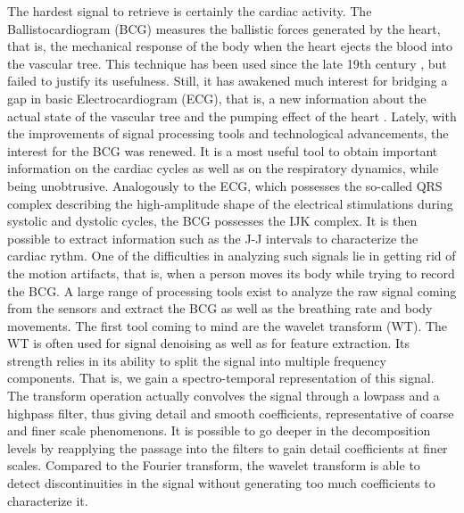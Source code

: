 \documentclass[twoside,onecolumn]{article}
\begin{document}
The hardest signal to retrieve is certainly the cardiac activity. The Ballistocardiogram (BCG) measures the ballistic forces generated by the heart, that is, the mechanical response of the body when the heart ejects the blood into the vascular tree. This technique has been used since the late 19th century \cite{gordon_certain_1877}, but failed to justify its usefulness. Still, it has awakened much interest for bridging a gap in basic Electrocardiogram (ECG), that is, a new information about the actual state of the vascular tree and the pumping effect of the heart \cite{singewald_ballistocardiography:_1954}. Lately, with the improvements of signal processing tools and technological advancements, the interest for the BCG was renewed. It is a most useful tool to obtain important information on the cardiac cycles as well as on the respiratory dynamics, while being unobtrusive. Analogously to the ECG, which possesses the so-called QRS complex describing the high-amplitude shape of the electrical stimulations during systolic and dystolic cycles, the BCG possesses the IJK complex. It is then possible to extract information such as the J-J intervals to characterize the cardiac rythm. One of the difficulties in analyzing such signals lie in getting rid of the motion artifacts, that is, when a person moves its body while trying to record the BCG.
A large range of processing tools exist to analyze the raw signal coming from the sensors and extract the BCG as well as the breathing rate and body movements. The first tool coming to mind are the wavelet transform (WT).
The WT is often used for signal denoising as well as for feature extraction. Its strength relies in its ability to split the signal into multiple frequency components. That is, we gain a spectro-temporal representation of this signal. The transform operation actually convolves the signal through  a lowpass and a highpass filter, thus giving detail and smooth coefficients, representative of coarse and finer scale phenomenons. It is possible to go deeper in the decomposition levels by reapplying the passage into the filters to gain detail coefficients at finer scales. Compared to the Fourier transform, the wavelet transform is able to detect discontinuities in the signal without generating too much coefficients to characterize it. 
\end{document}
